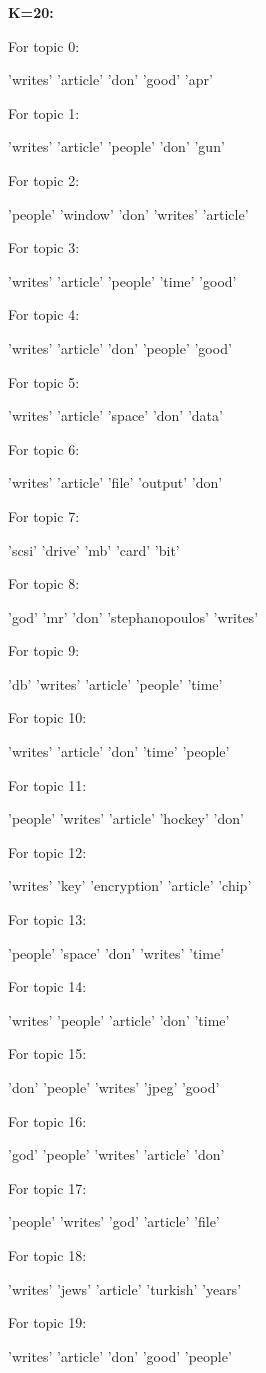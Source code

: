 \documentclass[12pt]{article}
\begin{document}
{\bf K=20:}
\par
\begin{multicols}{2}
For topic 0:
\par
'writes' 'article' 'don' 'good' 'apr' \par
For topic 1:
\par
'writes' 'article' 'people' 'don' 'gun' \par
For topic 2:
\par
'people' 'window' 'don' 'writes' 'article' \par
For topic 3:
\par
'writes' 'article' 'people' 'time' 'good' \par
For topic 4:
\par
'writes' 'article' 'don' 'people' 'good' \par
For topic 5:
\par
'writes' 'article' 'space' 'don' 'data' \par
For topic 6:
\par
'writes' 'article' 'file' 'output' 'don' \par
For topic 7:
\par
'scsi' 'drive' 'mb' 'card' 'bit' \par
For topic 8:
\par
'god' 'mr' 'don' 'stephanopoulos' 'writes' \par
For topic 9:
\par
'db' 'writes' 'article' 'people' 'time' \par
For topic 10:
\par
'writes' 'article' 'don' 'time' 'people' \par
For topic 11:
\par
'people' 'writes' 'article' 'hockey' 'don' \par
For topic 12:
\par
'writes' 'key' 'encryption' 'article' 'chip' \par
For topic 13:
\par
'people' 'space' 'don' 'writes' 'time' \par
For topic 14:
\par
'writes' 'people' 'article' 'don' 'time' \par
For topic 15:
\par
'don' 'people' 'writes' 'jpeg' 'good' \par
For topic 16:
\par
'god' 'people' 'writes' 'article' 'don' \par
For topic 17:
\par
'people' 'writes' 'god' 'article' 'file' \par
For topic 18:
\par
'writes' 'jews' 'article' 'turkish' 'years' \par
For topic 19:
\par
'writes' 'article' 'don' 'good' 'people' 
\end{multicols}
\end{document}
